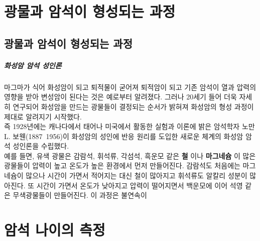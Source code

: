 \documentclass[12pt, a4paper, twoside]{book}
\begin{document}
	


	\clearpage
	\chapter{광물과 암석이 형성되는 과정}
	\minitoc				%



	\clearpage
	\section{광물과 암석이 형성되는 과정}
	


			\paragraph{화성암 암석 성인론}
			
			마그마가 식어 화성암이 되고 퇴적물이 굳어져 퇴적암이 되고 기존 암석이 열과 압력의 영향을 받아 변성암이 된다는 것은 예로부터 알려졌다. 
			그러나 20세기 들어 더욱 자세히 연구되어 화성암을 만드는 광물들이 결정되는 순서가 밝혀져 화성암의 형성 과정이 제대로 알려지기 시작했다.  \\
			
			즉 1928년에는 캐나다에서 태어나 미국에서 활동한 실험과 이론에 밝은 암석학자 노만 L. 보웬(1887~1956)이 화성암의 성인에 반응 원리를 도입한 새로운 체계의 화성암 암석 성인론을 수립했다.  \\

			예를 들면, 유색 광물은 감람석, 휘석류, 각섬석, 흑운모 같은 \textbf{ 철 }이나 \textbf{ 마그네슘 }이 많은 광물들이 압력이 높고 온도가 높은 환경에서 먼저 만들어진다. 
			감람석도 처음에는 마그네슘이 많으나 시간이 가면서 적어지는 대신 철이 많아지고 휘석류도 알칼리 성분이 많아진다. 
			또 시간이 가면서 온도가 낮아지고 압력이 떨어지면서 백운모에 이어 석영 같은 무색광물들이 만들어진다. 이 과정은 불연속이 



	\clearpage
	\chapter{암석 나이의 측정}
	\minitoc				%
\end{document}
